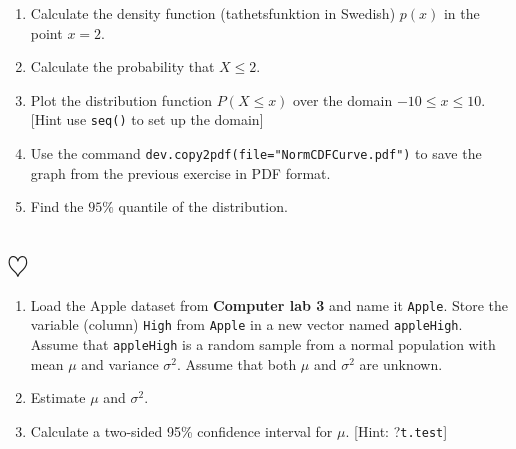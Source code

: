 \documentclass[a4paper]{article}
\begin{document}
  \begin{enumerate}
  \item Calculate the density function (tathetsfunktion in Swedish) $p(x)$ in the point $x = 2$.

  \item Calculate the probability that $X \leq 2$.

  \item Plot the distribution function $P(X\leq x)$ over the domain $-10 \leq x \leq
    10$. [Hint use \texttt{seq()} to set up the domain]
 
  \item Use the command \texttt{dev.copy2pdf(file="NormCDFCurve.pdf")} to save the graph
    from the previous exercise in PDF format.

  \item Find the $95\%$ quantile of the distribution.

  \end{enumerate}


\section{$\heartsuit$}
\begin{enumerate}
\item Load the Apple dataset from \textbf{Computer lab 3} and name
  it \texttt{Apple}. Store the variable (column)
  \texttt{High} from \texttt{Apple} in a new vector named \texttt{appleHigh}. Assume that
  \texttt{appleHigh} is a random sample from a normal population with mean $\mu$ and
  variance $\sigma^2$. Assume that both $\mu$ and $\sigma^2$ are unknown.

\item Estimate $\mu$ and $\sigma^2$.

\item Calculate a two-sided 95\% confidence interval for $\mu$.  [Hint: ?\texttt{t.test}]


\end{enumerate}
\end{document}
